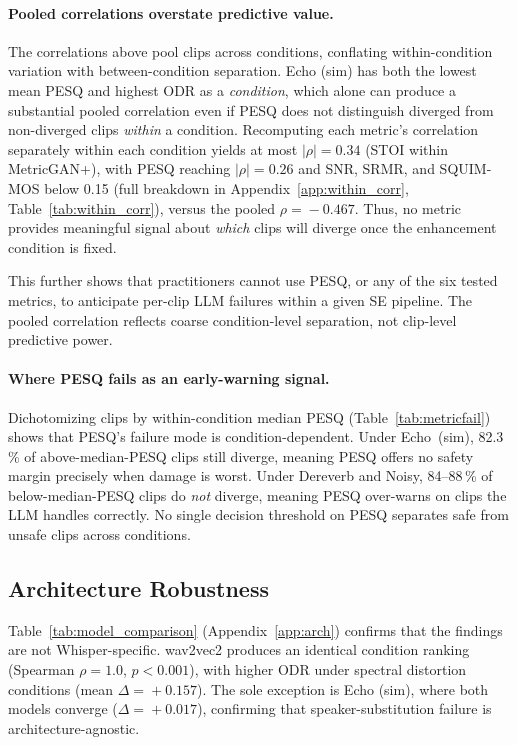 \documentclass[11pt]{article}
\begin{document}
\paragraph{Pooled correlations overstate predictive value.}
The correlations above pool clips across conditions, conflating
within-condition variation with between-condition separation.
Echo (sim) has both the lowest mean PESQ and highest ODR as a
\emph{condition}, which alone can produce a substantial pooled
correlation even if PESQ does not distinguish diverged from
non-diverged clips \emph{within} a condition. Recomputing each
metric's correlation separately within each condition yields at most
$|\rho| = 0.34$ (STOI within MetricGAN{+}), with PESQ reaching
$|\rho| = 0.26$ and SNR, SRMR, and SQUIM-MOS below 0.15 (full
breakdown in Appendix~\ref{app:within_corr},
Table~\ref{tab:within_corr}), versus the pooled $\rho\!=\!-0.467$.
Thus, no metric provides meaningful signal about \emph{which} clips
will diverge once the enhancement condition is fixed.

This further shows that practitioners cannot use PESQ, or any of the
six tested metrics, to anticipate per-clip LLM failures within a given
SE pipeline. The pooled correlation reflects coarse condition-level
separation, not clip-level predictive power.

\paragraph{Where PESQ fails as an early-warning signal.}
Dichotomizing clips by within-condition median PESQ
(Table~\ref{tab:metricfail}) shows
that PESQ's failure mode is condition-dependent. Under Echo~(sim),
82.3\,\% of above-median-PESQ clips still diverge, meaning PESQ offers
no safety margin precisely when damage is worst. Under Dereverb and
Noisy, 84--88\,\% of below-median-PESQ clips do \emph{not} diverge,
meaning PESQ over-warns on clips the LLM handles correctly. No single
decision threshold on PESQ separates safe from unsafe clips across
conditions.


 
\subsection{Architecture Robustness}

Table~\ref{tab:model_comparison} (Appendix~\ref{app:arch}) confirms
that the findings are not Whisper-specific. wav2vec2 produces an
identical condition ranking (Spearman $\rho\!=\!1.0$, $p\!<\!0.001$),
with higher ODR under spectral distortion conditions
(mean $\Delta\!=\!+0.157$). The sole exception is Echo (sim), where
both models converge ($\Delta\!=\!+0.017$), confirming that
speaker-substitution failure is architecture-agnostic.
\end{document}
